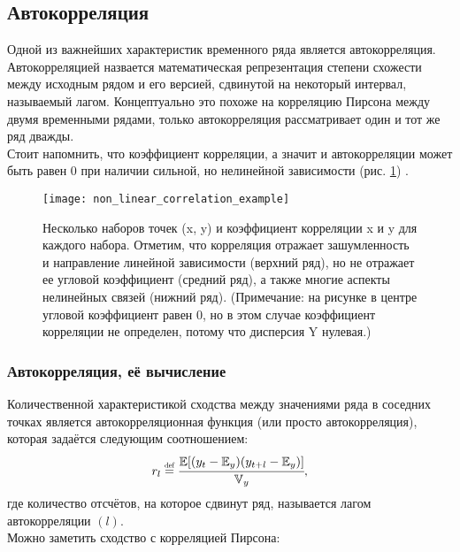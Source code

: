 \subsection{Автокорреляция}

Одной из важнейших характеристик временного ряда является автокорреляция. Автокорреляцией 
назвается математическая репрезентация степени \guillemotleft схожести\guillemotright {} между 
исходным рядом и его версией, сдвинутой на некоторый интервал, называемый лагом. Концептуально 
это похоже на корреляцию Пирсона между двумя временными рядами, только автокорреляция рассматривает 
один и тот же ряд дважды. \\

Стоит напомнить, что коэффициент корреляции, а значит и автокорреляции может быть равен 0 при наличии сильной, 
но нелинейной зависимости (рис. \ref{fig:non_linear_correlation_example}) \cite{pml1Book}.\\

\begin{figure}[h!]
    \centering
    \texttt{[image: non\_linear\_correlation\_example]}
    \caption{Несколько наборов точек (x, y) и коэффициент корреляции x и y
    для каждого набора. Отметим, что корреляция отражает зашумленность и направление 
    линейной зависимости (верхний ряд), но не отражает ее угловой
    коэффициент (средний ряд), а также многие аспекты нелинейных связей (нижний ряд). 
    (Примечание: на рисунке в центре угловой коэффициент равен 0, но
    в этом случае коэффициент корреляции не определен, потому что дисперсия Y
    нулевая.)}
    \label{fig:non_linear_correlation_example}
\end{figure}

\subsubsection{Автокорреляция, её вычисление}

Количественной характеристикой сходства между значениями ряда в соседних точках является 
автокорреляционная функция (или просто автокорреляция), которая задаётся следующим соотношением:\\

\begin{equation*}
    r_l \defeq \cfrac{\mathbb{E}[(y_t - \mathbb{E}_y)(y_{t+l} - \mathbb{E}_y)]}{\mathbb{V}_y},
\end{equation*}
где количество отсчётов, на которое сдвинут ряд, называется лагом автокорреляции $(l)$.\\
Можно заметить сходство с корреляцией Пирсона:

